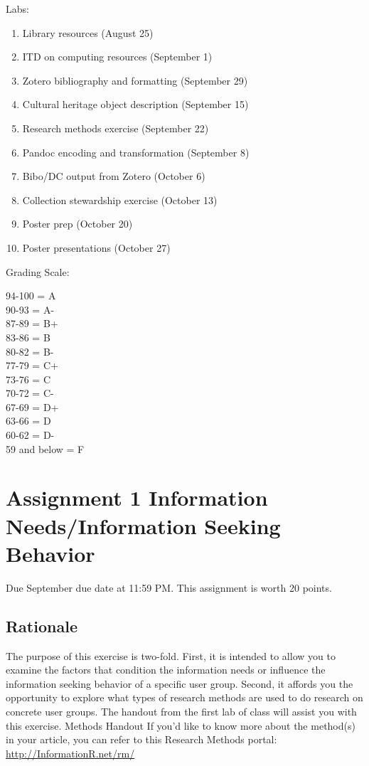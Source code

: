 \documentclass[]{article}
\providecommand{\tightlist}{%
  \setlength{\itemsep}{0pt}\setlength{\parskip}{0pt}}
\begin{document}
Labs:

\begin{enumerate}
\def\labelenumi{\arabic{enumi}.}
\tightlist
\item
  Library resources (August 25)
\item
  ITD on computing resources (September 1)
\item
  Zotero bibliography and formatting (September 29)
\item
  Cultural heritage object description (September 15)
\item
  Research methods exercise (September 22)
\item
  Pandoc encoding and transformation (September 8)
\item
  Bibo/DC output from Zotero (October 6)
\item
  Collection stewardship exercise (October 13)
\item
  Poster prep (October 20)
\item
  Poster presentations (October 27)
\end{enumerate}

Grading Scale:

94-100 = A\\
90-93 = A-\\
87-89 = B+\\
83-86 = B\\
80-82 = B-\\
77-79 = C+\\
73-76 = C\\
70-72 = C-\\
67-69 = D+\\
63-66 = D\\
60-62 = D-\\
59 and below = F

\section{Assignment 1 Information Needs/Information Seeking
Behavior}\label{Asgt1}

Due September due date at 11:59 PM. This assignment is worth 20 points.

\subsection{Rationale}\label{rationale}

The purpose of this exercise is two-fold. First, it is intended to allow
you to examine the factors that condition the information needs or
influence the information seeking behavior of a specific user group.
Second, it affords you the opportunity to explore what types of research
methods are used to do research on concrete user groups. The handout
from the first lab of class will assist you with this exercise. Methods
Handout If you'd like to know more about the method(s) in your article,
you can refer to this Research Methods portal:
\url{http://InformationR.net/rm/}
\end{document}
